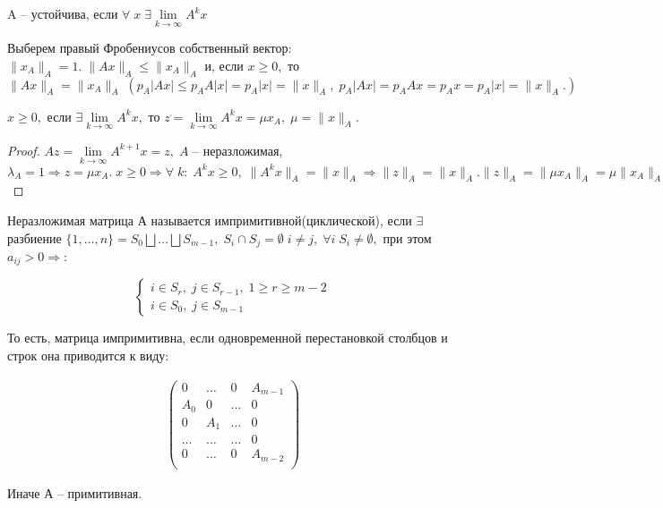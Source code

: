 \begin{definition}
	A -- устойчива, если $\forall \; x \; \exists \lim\limits_{k \to \infty}A^k x$
\end{definition}

\begin{remark}
	Выберем правый Фробениусов собственный вектор: $\| x_A\|_A = 1. \; \| Ax\|_A \leq \| x_A\|_A$ и, если $x \geq 0,$ то $\| Ax\|_A = \| x_A\|_A \; (p_A |Ax| \leq p_A A |x| = p_A |x| = \| x \|_A, \; p_A |Ax| = p_A A x = p_A x = p_A |x| = \| x\|_A. )$
\end{remark}

\begin{clair}
	$x \geq 0, $ если $\exists \lim\limits_{k \to \infty}A^k x,$ то $z = \lim\limits_{k \to \infty}A^kx = \mu x_A, \; \mu = \| x\|_A.$
\end{clair}

\begin{proof}
	$Az = \lim\limits_{k \to \infty}A^{k + 1}x = z, \; A$ -- неразложимая, $\lambda_A = 1 \Rightarrow z = \mu x_A. \; x \geq 0 \Rightarrow \forall \; k: \; A^kx \geq 0, \; \| A^kx\|_A = \| x\|_A \Rightarrow \| z\|_A = \| x\|_A. \| z\|_A = \| \mu x_A\|_A = \mu \| x_A\|_A = \mu = \| x\|_A.$
\end{proof}

\begin{definition}
	Неразложимая матрица А называется импримитивной(циклической), если $\exists$ разбиение $\{ 1, \ldots, n\} = S_0 \bigsqcup \ldots \bigsqcup S_{m - 1}, \; S_i \cap S_j = \emptyset \; i \neq j, \; \forall i \; S_i \neq \emptyset, $ при этом $a_{ij} > 0 \Rightarrow$:

	$$\begin{cases}
		i \in S_r, \; j \in S_{r - 1}, \; 1 \geq r \geq m - 2 \\
		i \in S_0, \; j \in S_{m - 1}
	\end{cases}$$

	То есть, матрица импримитивна, если одновременной перестановкой столбцов и строк она приводится к виду: 

	\begin{gather*}
		\begin{pmatrix}
		  0 & \ldots & 0 & A_{m-1}\\
		  A_0 & 0 & \ldots & 0\\
		  0 & A_1 & \ldots & 0\\
		  \ldots & \ldots & \ldots & 0\\
		  0 & \ldots & 0 &  A_{m-2}\\
		\end{pmatrix}
	\end{gather*}

	Иначе А -- примитивная.
\end{definition}

